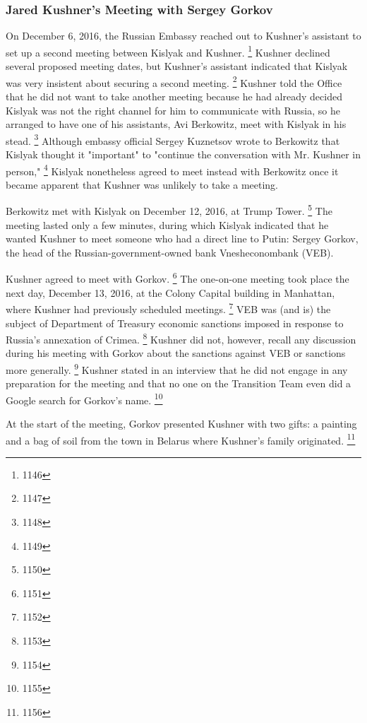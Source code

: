 \subsubsection{Jared Kushner's Meeting with Sergey Gorkov}

On December 6, 2016, the Russian Embassy reached out to Kushner's assistant to set up a second meeting between Kislyak and Kushner.%
\footnote{1146}
Kushner declined several proposed meeting dates, but Kushner's assistant indicated that Kislyak was very insistent about securing a second meeting.%
\footnote{1147}
Kushner told the Office that he did not want to take another meeting because he had already decided Kislyak was not the right channel for him to communicate with Russia, so he arranged to have one of his assistants, Avi Berkowitz, meet with Kislyak in his stead.%
\footnote{1148}
Although embassy official Sergey Kuznetsov wrote to Berkowitz that Kislyak thought it "important" to "continue the conversation with Mr. Kushner in person,"%
\footnote{1149}
Kislyak nonetheless agreed to meet instead with Berkowitz once it became apparent that Kushner was unlikely to take a meeting.

Berkowitz met with Kislyak on December 12, 2016, at Trump Tower.%
\footnote{1150}
The meeting lasted only a few minutes, during which Kislyak indicated that he wanted Kushner to meet someone who had a direct line to Putin: Sergey Gorkov, the head of the Russian-government-owned bank Vnesheconombank (VEB).

Kushner agreed to meet with Gorkov.%
\footnote{1151}
The one-on-one meeting took place the next day, December 13, 2016, at the Colony Capital building in Manhattan, where Kushner had previously scheduled meetings.%
\footnote{1152}
VEB was (and is) the subject of Department of Treasury economic sanctions imposed in response to Russia's annexation of Crimea.%
\footnote{1153}
Kushner did not, however, recall any discussion during his meeting with Gorkov about the sanctions against VEB or sanctions more generally.%
\footnote{1154}
Kushner stated in an interview that he did not engage in any preparation for the meeting and that no one on the Transition Team even did a Google search for Gorkov's name.%
\footnote{1155}

At the start of the meeting, Gorkov presented Kushner with two gifts: a painting and a bag of soil from the town in Belarus where Kushner's family originated.%
\footnote{1156}


